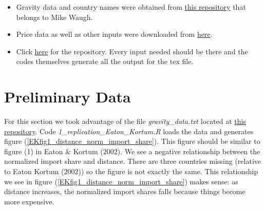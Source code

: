 \documentclass[a4paper,12pt]{article}
\begin{document}
\begin{itemize}
    \item Gravity data and country names were obtained from \href{https://github.com/mwaugh0328/Gravity-Estimation}{this repository} that belongs to Mike Waugh. 
    
    \item Price data as well as other inputs were downloaded from \href{https://www.openicpsr.org/openicpsr/project/112382/version/V1/view?path=/openicpsr/112382/fcr:versions/V1/data_code_AER_20070560/Data&type=folder}{here}.
    
    \item Click \href{https://github.com/javiertasso/econ714_replication_tasso}{here} for the repository. Every input needed should be there and the codes themselves generate all the output for the tex file. 
    
    
    
\end{itemize}

\section{Preliminary Data}

 For this section we took advantage of the file \textit{gravity\_data.txt} located at \href{https://github.com/mwaugh0328/Gravity-Estimation}{this repository}. Code \textit{1\_replication\_Eaton\_Kortum.R} loads the data and generates figure (\ref{EKfig1_distance_norm_import_share}). This figure should be similar to figure (1) in Eaton \& Kortum ($2002$). We see a negative relationship between the normalized import share and distance. There are three countries missing (relative to Eaton Kortum ($2002$)) so the figure is not exactly the same. This relationship we see in figure (\ref{EKfig1_distance_norm_import_share}) makes sense: as distance increases, the normalized import shares falls because things become more expensive. 
  
 
\end{document}
